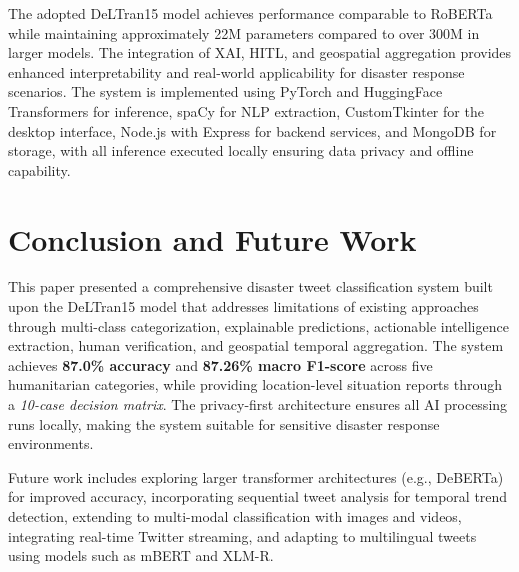 \documentclass[pdflatex,sn-mathphys-num]{sn-jnl}
\theoremstyle{thmstyleone}%
\theoremstyle{thmstyletwo}%
\theoremstyle{thmstylethree}%
\begin{document}
The adopted DeLTran15 model achieves performance comparable to RoBERTa while maintaining approximately 22M parameters compared to over 300M in larger models. The integration of XAI, HITL, and geospatial aggregation provides enhanced interpretability and real-world applicability for disaster response scenarios. The system is implemented using PyTorch and HuggingFace Transformers for inference, spaCy for NLP extraction, CustomTkinter for the desktop interface, Node.js with Express for backend services, and MongoDB for storage, with all inference executed locally ensuring data privacy and offline capability.

\section{Conclusion and Future Work}

This paper presented a comprehensive disaster tweet classification system built upon the DeLTran15 model \cite{ref16} that addresses limitations of existing approaches through multi-class categorization, explainable predictions, actionable intelligence extraction, human verification, and geospatial temporal aggregation. The system achieves \textbf{87.0\% accuracy} and \textbf{87.26\% macro F1-score} across five humanitarian categories, while providing location-level situation reports through a \textit{10-case decision matrix}. The privacy-first architecture ensures all AI processing runs locally, making the system suitable for sensitive disaster response environments.

Future work includes exploring larger transformer architectures (e.g., DeBERTa) for improved accuracy, incorporating sequential tweet analysis for temporal trend detection, extending to multi-modal classification with images and videos, integrating real-time Twitter streaming, and adapting to multilingual tweets using models such as mBERT and XLM-R.
\end{document}

